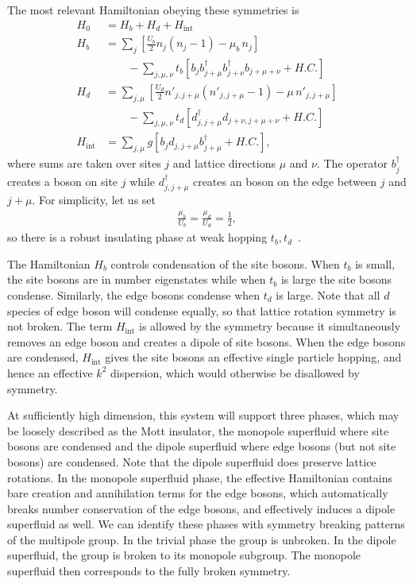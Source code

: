 \documentclass[twocolumn, longbibliography]{revtex4-2}
\newcommand{\nn}{\nonumber\\}
\begin{document}
The most relevant Hamiltonian obeying these symmetries is  
\begin{align}
H_0  &= H_b + H_d + H_\text{int}\nn
H_b &= \sum_j \left[ \frac{U_b}{2}  n_j (n_j-1) - \mu_b \, n_j \right] \nn
&\qquad - \sum_{j,\mu,\nu} t_b \left[  b_j b^{\dag}_{j+\mu} b^{\dag}_{j+\nu} b_{j+\mu+\nu} + H.C. \right]\nn
H_d &= \sum_{j,\mu} \left[ \frac{U_d}{2} n'_{j,j+\mu} (n'_{j,j+\mu} - 1) -\mu \, n'_{j, j + \mu} \right]\nn
&\qquad  - \sum_{j,\mu,\nu} t_d \left[d^{\dag}_{j, j + \mu} d_{j + \nu, j+\mu + \nu} +H.C.\right]\nn
H_\text{int} &= \sum_{j,\mu} g\left[ b_j d_{j,j+\mu} b^\dag_{j+\mu} + H.C. \right],
\end{align}
where sums are taken over sites $j$ and lattice directions $\mu$ and $\nu$.  The operator $b^\dagger_j$ creates a boson on site $j$ while $d^\dagger_{j,j+\mu}$ creates an boson on the edge between $j$ and $j+\mu$. For simplicity, let us set 
\begin{align}
\frac{\mu_b}{ U_b} = \frac{\mu_d }{ U_d} = \frac{1}{2},
\end{align}
so there is a robust insulating phase at weak hopping $t_b, t_d$~\cite{Fisheretal}. 

The Hamiltonian $H_b$ controls condensation of the site bosons. When $t_b$ is small, the site bosons are in number eigenstates while when $t_b$ is large the site bosons condense. Similarly, the edge bosons condense when $t_d$ is large. Note that all $d$ species of edge boson will condense equally, so that lattice rotation symmetry is not broken. The term $H_\text{int}$ is allowed by the symmetry because it simultaneously removes an edge boson and creates a dipole of site bosons. When the edge bosons are condensed, $H_\text{int}$ gives the site bosons an effective single particle hopping, and hence an effective $k^2$ dispersion, which would otherwise be disallowed by symmetry.

At sufficiently high dimension, this system will support three phases, which may be loosely described as the Mott insulator, the monopole superfluid where site bosons are condensed and the dipole superfluid where edge bosons (but not site bosons) are condensed. 
Note that the dipole superfluid does preserve lattice rotations.
In the monopole superfluid phase, the effective Hamiltonian contains bare creation and annihilation terms for the edge bosons, which automatically breaks number conservation of the edge bosons, and effectively induces a dipole superfluid as well. We can identify these phases with symmetry breaking patterns of the multipole group. In the trivial phase the group is unbroken. In the dipole superfluid, the group is broken to its monopole subgroup. The monopole superfluid then corresponds to the fully broken symmetry.
\end{document}
